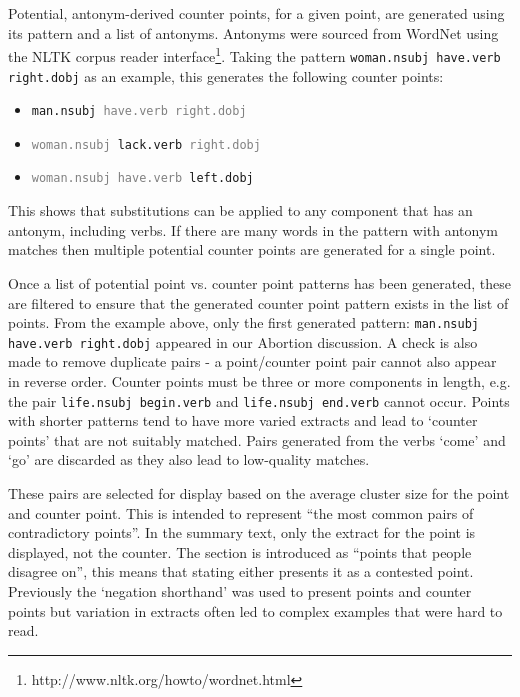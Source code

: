       Potential, antonym-derived counter points, for a given point, are generated using its pattern and a list of antonyms. Antonyms were sourced from WordNet \cite{miller1995wordnet} using the NLTK corpus reader interface\footnote{http://www.nltk.org/howto/wordnet.html}. Taking the pattern \texttt{woman.nsubj have.verb right.dobj} as an example, this generates the following counter points:

      \begin{itemize}[label={$\bullet$}]
        \item{\texttt{man.nsubj \textcolor{gray}{have.verb right.dobj}}}
        \item{\texttt{\textcolor{gray}{woman.nsubj} lack.verb \textcolor{gray}{right.dobj}}}
        \item{\texttt{\textcolor{gray}{woman.nsubj have.verb} left.dobj}}
      \end{itemize}

      This shows that substitutions can be applied to any component that has an antonym, including verbs. If there are many words in the pattern with antonym matches then multiple potential counter points are generated for a single point.

      Once a list of potential point vs. counter point patterns has been generated, these are filtered to ensure that the generated counter point pattern exists in the list of points. From the example above, only the first generated pattern: \texttt{man.nsubj have.verb right.dobj} appeared in our Abortion discussion. A check is also made to remove duplicate pairs - a point/counter point pair cannot also appear in reverse order. Counter points must be three or more components in length, e.g. the pair \texttt{life.nsubj begin.verb} and \texttt{life.nsubj end.verb} cannot occur. Points with shorter patterns tend to have more varied extracts and lead to `counter points' that are not suitably matched. Pairs generated from the verbs `come' and `go' are discarded as they also lead to low-quality matches.

      These pairs are selected for display based on the average cluster size for the point and counter point. This is intended to represent ``the most common pairs of contradictory points''. In the summary text, only the extract for the point is displayed, not the counter. The section is introduced as ``points that people disagree on'', this means that stating either presents it as a contested point. Previously the `negation shorthand' was used to present points and counter points but variation in extracts often led to complex examples that were hard to read.

